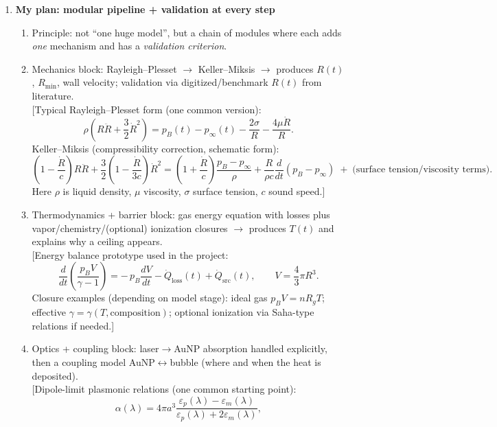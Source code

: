 \documentclass[11pt]{article}
\begin{document}
\begin{enumerate}
		\item \textbf{My plan: modular pipeline + validation at every step}
		\begin{enumerate}
			\item Principle: not ``one huge model'', but a chain of modules where each adds \emph{one} mechanism and has a \emph{validation criterion}.
			\item Mechanics block: Rayleigh--Plesset $\rightarrow$ Keller--Miksis $\rightarrow$ produces $R(t)$, $R_{\min}$, wall velocity; validation via digitized/benchmark $R(t)$ from literature.\\
			\hspace*{1.2em}[Typical Rayleigh--Plesset form (one common version):\\
			\[
			\rho\!\left(R\ddot R+\frac{3}{2}\dot R^{2}\right)
			= p_{B}(t)-p_{\infty}(t)-\frac{2\sigma}{R}-\frac{4\mu \dot R}{R}.
			\]
			Keller--Miksis (compressibility correction, schematic form):\\
			\[
			\left(1-\frac{\dot R}{c}\right)R\ddot R
			+\frac{3}{2}\left(1-\frac{\dot R}{3c}\right)\dot R^2
			=\left(1+\frac{\dot R}{c}\right)\frac{p_B-p_\infty}{\rho}
			+\frac{R}{\rho c}\frac{d}{dt}(p_B-p_\infty)
			\;+\;\text{(surface tension/viscosity terms)}.
			\]
			Here $\rho$ is liquid density, $\mu$ viscosity, $\sigma$ surface tension, $c$ sound speed.]
			\item Thermodynamics + barrier block: gas energy equation with losses plus vapor/chemistry/(optional) ionization closures $\rightarrow$ produces $T(t)$ and explains why a ceiling appears.\\
			\hspace*{1.2em}[Energy balance prototype used in the project:\\
			\[
			\frac{d}{dt}\!\left(\frac{p_B V}{\gamma-1}\right)
			=-\,p_B\frac{dV}{dt}-\dot{Q}_{\mathrm{loss}}(t)+\dot{Q}_{\mathrm{src}}(t),
			\qquad
			V=\frac{4}{3}\pi R^{3}.
			\]
			Closure examples (depending on model stage): ideal gas $p_B V = n R_g T$; effective $\gamma=\gamma(T,\text{composition})$; optional ionization via Saha-type relations if needed.]
			\item Optics + coupling block: laser$\rightarrow$AuNP absorption handled explicitly, then a coupling model AuNP$\leftrightarrow$bubble (where and when the heat is deposited).\\
			\hspace*{1.2em}[Dipole-limit plasmonic relations (one common starting point):\\
			\[
			\alpha(\lambda)=4\pi a^{3}\frac{\varepsilon_p(\lambda)-\varepsilon_m(\lambda)}{\varepsilon_p(\lambda)+2\varepsilon_m(\lambda)},
\]
\end{enumerate}
\end{enumerate}
\end{document}
